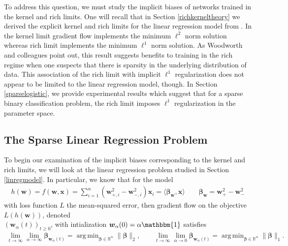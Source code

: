 \documentclass{article}
\DeclareMathOperator*{\argmin}{arg\,min}
\begin{document}
To address this question, we must study the implicit biases of networks trained in the kernel and rich limits. One will recall that in Section \ref{richkerneltheory} we derived the explicit kernel and rich limits for the linear regression model from \cite{woodworth2020kernel}. In the kernel limit gradient flow implements the minimum $\ell^2$ norm solution whereas rich limit implements the minimum $\ell^1$ norm solution. As Woodworth and colleagues point out, this result suggests benefits to training in the rich regime when one suspects that there is sparsity in the underlying distribution of data. This association of the rich limit with implicit $\ell^1$ regularization does not appear to be limited to the linear regression model, though. In Section \ref{sparselogistic}, we provide experimental results which suggest that for a sparse binary classification problem, the rich limit imposes $\ell^1$ regularization in the parameter space.

\subsection{The Sparse Linear Regression Problem}\label{sparselinear}

To begin our examination of the implicit biases corresponding to the kernel and rich limits, we will look at the linear regression problem studied in Section \ref{linregmodel}. In particular, we know that for the model
\begin{align*}
    h(\boldsymbol{w}) = f(\boldsymbol{w}, \boldsymbol{x}) = \sum_{i=1}^n(\boldsymbol{w}_{+, i}^2 - \boldsymbol{w}_{-, i}^2)\boldsymbol{x}_i = \langle \boldsymbol{\beta}_{\boldsymbol{w}}, \boldsymbol{x} \rangle \qquad \boldsymbol{\beta}_{\boldsymbol{w}} = \boldsymbol{w}_+^2 -\boldsymbol{w}_-^2
\end{align*}
with loss function $L$ the mean-squared error, then gradient flow on the objective $L(h(\boldsymbol{w}))$, denoted\\ $(\boldsymbol{w}_{\alpha}(t))_{t \geq 0}$, with intialization $\boldsymbol{w}_{\alpha}(0) = \alpha \mathbbm{1}$ satisfies
\begin{align*}
    \lim_{t \to \infty}\lim_{\alpha \to \infty} \boldsymbol{\beta}_{\boldsymbol{w}_{\alpha}(t)} = \argmin_{\boldsymbol{\beta} \in \mathbb{R}^n}  \| \boldsymbol{\beta} \|_2, \qquad 
    \lim_{t \to \infty}\lim_{\alpha \to 0} \boldsymbol{\beta}_{\boldsymbol{w}_{\alpha}(t)} = \argmin_{\boldsymbol{\beta} \in \mathbb{R}^n}  \| \boldsymbol{\beta} \|_1.
\end{align*}
\end{document}
